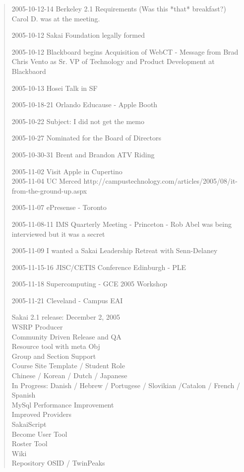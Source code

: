 \begin{quote}
2005-10-12-14  Berkeley 2.1 Requirements (Was this *that* 
breakfast?)  Carol D. was at the meeting.

2005-10-12 Sakai Foundation legally formed

2005-10-12 Blackboard begins Acquisition of WebCT - Message from Brad
Chris Vento as Sr. VP of Technology and Product Development at Blackbaord

2005-10-13 Hosei Talk in SF

2005-10-18-21 Orlando Educause - Apple Booth

2005-10-22 Subject: I did not get the memo

2005-10-27 Nominated for the Board of Directors

2005-10-30-31 Brent and Brandon ATV Riding

2005-11-02 Visit Apple in Cupertino\\
2005-11-04 UC Merced
http://campustechnology.com/articles/2005/08/it-from-the-ground-up.aspx

2005-11-07 ePresense - Toronto

2005-11-08-11 IMS Quarterly Meeting - Princeton - Rob Abel was 
being interviewed but it was a secret

2005-11-09 I wanted a Sakai Leadership Retreat with Senn-Delaney

2005-11-15-16 JISC/CETIS Conference Edinburgh - PLE

2005-11-18 Supercomputing - GCE 2005 Workshop

2005-11-21 Cleveland - Campus EAI

Sakai 2.1 release: December 2, 2005\\
WSRP Producer\\
Community Driven Release and QA\\
Resource tool with meta Obj\\
Group and Section Support\\
Course Site Template / Student Role\\
Chinese / Korean / Dutch / Japanese\\
In Progress: Danish / Hebrew / Portugese / Slovikian  /Catalon /  French  / Spanish\\
MySql Performance Improvement\\
Improved Providers\\
SakaiScript\\
Become User Tool\\
Roster Tool\\
Wiki\\
Repository OSID / TwinPeaks\\


\end{quote}
